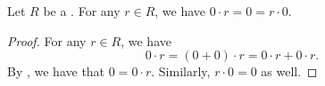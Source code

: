 \begin{lemma} \label{lemma:multiplication_by_zero_in_a_ring_is_zero}
    Let $R$ be a . For any $r \in R$, we have $0 \cdot r = 0 = r \cdot 0$.
\end{lemma}
\begin{proof}
    For any $r \in R$, we have 
    $$0 \cdot r = (0+0) \cdot r = 0 \cdot r + 0 \cdot r.$$
    By , we have that $0 = 0 \cdot r$. Similarly, $r \cdot 0 = 0$ as well.
\end{proof}